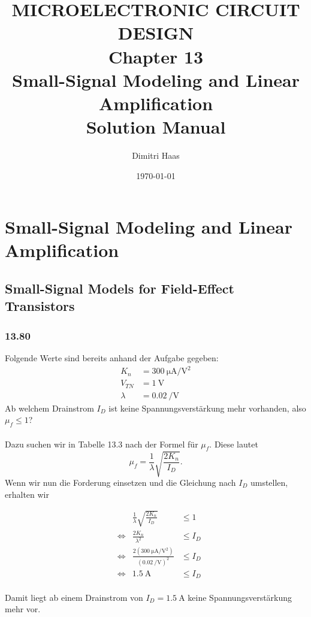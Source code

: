 \documentclass[11pt,a4paper,titlepage]{article}
\title{\blue MICROELECTRONIC CIRCUIT DESIGN \\	\blueb Chapter 13 \\ Small-Signal Modeling and Linear Amplification \\ Solution Manual}
\author{Dimitri Haas}
\date{\today}
\begin{document}
\maketitle
\setcounter{section}{12}
\section{Small-Signal Modeling and Linear Amplification}
\setcounter{subsection}{7}
\subsection{Small-Signal Models for Field-Effect Transistors}
\subsubsection*{13.80}
Folgende Werte sind bereits anhand der Aufgabe gegeben:
\begin{equation*}
\begin{aligned}
K_n &= \SI{300}{\micro\ampere\per\square\volt}\\
V_{TN} &= \SI{1}{\volt}\\
\lambda &= \SI{0.02}{\per\volt}
\end{aligned}
\end{equation*}
Ab welchem Drainstrom $I_D$ ist keine Spannungsverstärkung mehr vorhanden, also $\mu_f \leq 1$?\\
\\
Dazu suchen wir in Tabelle 13.3 nach der Formel für $\mu_f$. Diese lautet
\[\mu_f = \frac{1}{\lambda}\sqrt{\frac{2K_n}{I_D}}.\]
Wenn wir nun die Forderung einsetzen und die Gleichung nach $I_D$ umstellen, erhalten wir

\begin{equation*}
\begin{aligned}
 & &\frac{1}{\lambda}\sqrt{\frac{2K_n}{I_D}} &\leq 1 \\
& \Leftrightarrow & \frac{2K_n}{\lambda^2} &\leq I_D \\
& \Leftrightarrow & \frac{2(\SI{300}{\micro\ampere\per\square\volt})}{(\SI{0.02}{\per\volt})^2} &\leq I_D \\
& \Leftrightarrow & \SI{1.5}{\ampere} &\leq I_D
\end{aligned}
\end{equation*}\\
Damit liegt ab einem Drainstrom von $I_D = \SI{1.5}{\ampere}$ keine Spannungsverstärkung mehr vor.
\end{document}
